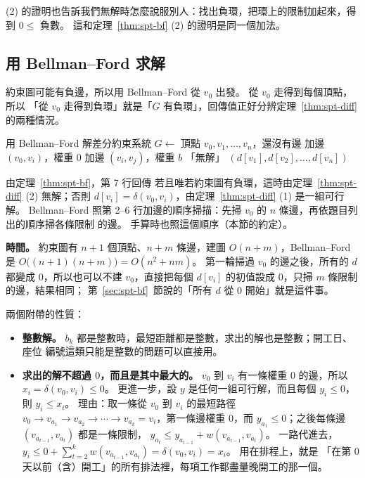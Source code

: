 (2) 的證明也告訴我們無解時怎麼說服別人：找出負環，把環上的限制加起來，得到 $0 \le$ 負數。
這和定理~\ref{thm:spt-bf} (2) 的證明是同一個加法。

\subsection{用 Bellman--Ford 求解}

約束圖可能有負邊，所以用 Bellman--Ford 從 $v_0$ 出發。 從 $v_0$ 走得到每個頂點，所以
「從 $v_0$ 走得到負環」就是「$G$ 有負環」，回傳值正好分辨定理~\ref{thm:spt-diff} 的兩種情況。

\begin{pseudo}[label=alg:spt-diff]{用 Bellman--Ford 解差分約束系統}
    \State $G \gets$ 頂點 $v_0, v_1, \ldots, v_n$，還沒有邊
        \State 加邊 $(v_0, v_i)$，權重 $0$
    \EndFor
     
        \State 加邊 $(v_i, v_j)$，權重 $b$
    \EndFor
        \State \Return 「無解」
    \EndIf
    \State \Return $(d[v_1], d[v_2], \ldots, d[v_n])$
\EndFunction
\end{pseudo}

由定理~\ref{thm:spt-bf}，第 7 行回傳 \FALSE 若且唯若約束圖有負環，這時由定理~\ref{thm:spt-diff}
(2) 無解；否則 $d[v_i] = \delta(v_0, v_i)$，由定理~\ref{thm:spt-diff} (1) 是一組可行解。
Bellman--Ford 照第 2--6 行加邊的順序掃描：先掃 $v_0$ 的 $n$ 條邊，再依題目列出的順序掃各條限制
的邊。 手算時也照這個順序（本節的約定）。

\textbf{時間。} 約束圖有 $n + 1$ 個頂點、$n + m$ 條邊，建圖 $O(n + m)$，Bellman--Ford 是
$O\bigl((n + 1)(n + m)\bigr) = O(n^2 + nm)$。 第一輪掃過 $v_0$ 的邊之後，所有的 $d$ 都變成
$0$，所以也可以不建 $v_0$，直接把每個 $d[v_i]$ 的初值設成 $0$，只掃 $m$ 條限制的邊，結果相同；
第~\ref{sec:spt-bf}~節說的「所有 $d$ 從 $0$ 開始」就是這件事。

兩個附帶的性質：
\begin{itemize}
\item \textbf{整數解。} $b_k$ 都是整數時，最短距離都是整數，求出的解也是整數；開工日、座位
編號這類只能是整數的問題可以直接用。
\item \textbf{求出的解不超過 $0$，而且是其中最大的。} $v_0$ 到 $v_i$ 有一條權重 $0$ 的邊，所以
$x_i = \delta(v_0, v_i) \le 0$。 更進一步，設 $y$ 是任何一組可行解，而且每個 $y_i \le 0$，
則 $y_i \le x_i$。 理由：取一條從 $v_0$ 到 $v_i$ 的最短路徑
$v_0 \to v_{a_1} \to v_{a_2} \to \cdots \to v_{a_k} = v_i$，第一條邊權重 $0$，而
$y_{a_1} \le 0$；之後每條邊 $(v_{a_{t-1}}, v_{a_t})$ 都是一條限制，
$y_{a_t} \le y_{a_{t-1}} + w(v_{a_{t-1}}, v_{a_t})$。 一路代進去，
$y_i \le 0 + \sum_{t=2}^{k} w(v_{a_{t-1}}, v_{a_t}) = \delta(v_0, v_i) = x_i$。 用在排程上，就是
「在第 $0$ 天以前（含）開工」的所有排法裡，每項工作都盡量晚開工的那一個。
\end{itemize}

